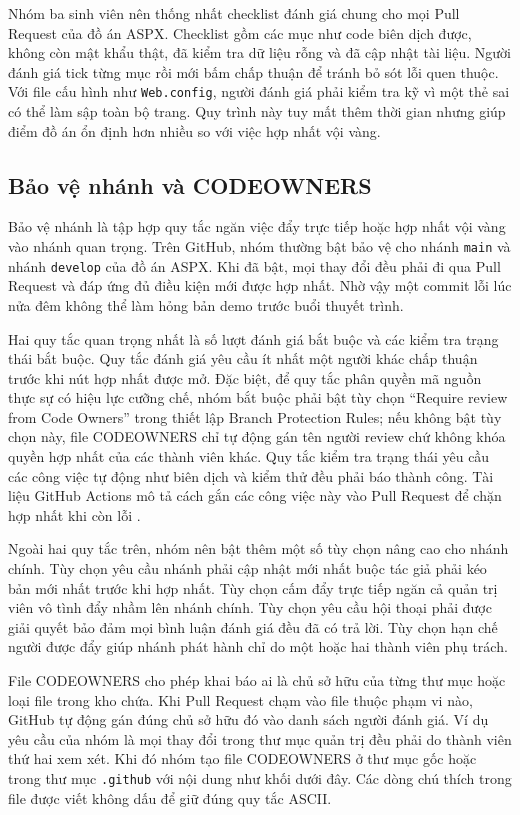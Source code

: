 Nhóm ba sinh viên nên thống nhất checklist đánh giá chung cho mọi Pull Request của đồ án ASPX.
Checklist gồm các mục như code biên dịch được, không còn mật khẩu thật, đã kiểm tra dữ liệu rỗng và đã cập nhật tài liệu.
Người đánh giá tick từng mục rồi mới bấm chấp thuận để tránh bỏ sót lỗi quen thuộc.
Với file cấu hình như \verb|Web.config|, người đánh giá phải kiểm tra kỹ vì một thẻ sai có thể làm sập toàn bộ trang.
Quy trình này tuy mất thêm thời gian nhưng giúp điểm đồ án ổn định hơn nhiều so với việc hợp nhất vội vàng.

\subsection{Bảo vệ nhánh và CODEOWNERS}
\label{subsec:c4-bao-ve-nhanh}
Bảo vệ nhánh là tập hợp quy tắc ngăn việc đẩy trực tiếp hoặc hợp nhất vội vàng vào nhánh quan trọng.
Trên GitHub, nhóm thường bật bảo vệ cho nhánh \verb|main| và nhánh \verb|develop| của đồ án ASPX.
Khi đã bật, mọi thay đổi đều phải đi qua Pull Request và đáp ứng đủ điều kiện mới được hợp nhất.
Nhờ vậy một commit lỗi lúc nửa đêm không thể làm hỏng bản demo trước buổi thuyết trình.

Hai quy tắc quan trọng nhất là số lượt đánh giá bắt buộc và các kiểm tra trạng thái bắt buộc.
Quy tắc đánh giá yêu cầu ít nhất một người khác chấp thuận trước khi nút hợp nhất được mở.
Đặc biệt, để quy tắc phân quyền mã nguồn thực sự có hiệu lực cưỡng chế, nhóm bắt buộc phải bật tùy chọn ``Require review from Code Owners'' trong thiết lập Branch Protection Rules; nếu không bật tùy chọn này, file CODEOWNERS chỉ tự động gán tên người review chứ không khóa quyền hợp nhất của các thành viên khác.
Quy tắc kiểm tra trạng thái yêu cầu các công việc tự động như biên dịch và kiểm thử đều phải báo thành công.
Tài liệu GitHub Actions mô tả cách gắn các công việc này vào Pull Request để chặn hợp nhất khi còn lỗi \cite{ghactions}.

Ngoài hai quy tắc trên, nhóm nên bật thêm một số tùy chọn nâng cao cho nhánh chính.
Tùy chọn yêu cầu nhánh phải cập nhật mới nhất buộc tác giả phải kéo bản mới nhất trước khi hợp nhất.
Tùy chọn cấm đẩy trực tiếp ngăn cả quản trị viên vô tình đẩy nhầm lên nhánh chính.
Tùy chọn yêu cầu hội thoại phải được giải quyết bảo đảm mọi bình luận đánh giá đều đã có trả lời.
Tùy chọn hạn chế người được đẩy giúp nhánh phát hành chỉ do một hoặc hai thành viên phụ trách.

File CODEOWNERS cho phép khai báo ai là chủ sở hữu của từng thư mục hoặc loại file trong kho chứa.
Khi Pull Request chạm vào file thuộc phạm vi nào, GitHub tự động gán đúng chủ sở hữu đó vào danh sách người đánh giá.
Ví dụ yêu cầu của nhóm là mọi thay đổi trong thư mục quản trị đều phải do thành viên thứ hai xem xét.
Khi đó nhóm tạo file CODEOWNERS ở thư mục gốc hoặc trong thư mục \verb|.github| với nội dung như khối dưới đây.
Các dòng chú thích trong file được viết không dấu để giữ đúng quy tắc ASCII.


